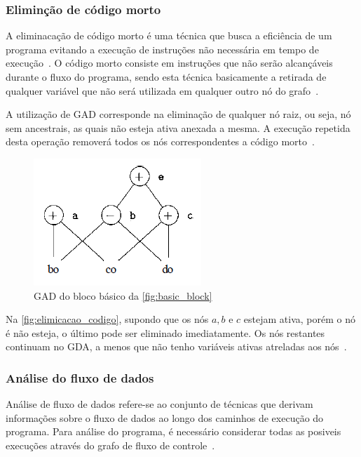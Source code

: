 

\subsubsection{Eliminção de código morto}

A eliminacação de código morto é uma técnica que busca a eficiência de um programa evitando a execução de instruções não necessária em tempo de execução~\cite{knoop1994partial}. O código morto consiste em instruções que não serão alcançáveis durante o fluxo do programa, sendo esta técnica basicamente a  retirada de qualquer variável que não será utilizada em qualquer outro nó do grafo~\cite{aho2007compilers}.

\par
A utilização de GAD corresponde na eliminação de qualquer nó raiz, ou seja, nó sem ancestrais, as quais não esteja ativa anexada a mesma. A execução repetida desta operação removerá todos os nós correspondentes a código morto~\cite{aho2007compilers}.

\begin{figure}[htb]
	\begin{center}
    \caption{\label{fig:elimicacao_codigo}GAD do bloco básico da \autoref{fig:basic_block}}
	\includegraphics[scale=0.70]{Figuras/eliminacao_codigo.png}
	\end{center}
\end{figure}

Na \autoref{fig:elimicacao_codigo}, supondo que os nós $a,b$ e $c$ estejam ativa, porém o nó é não esteja, o último pode ser eliminado imediatamente. Os nós restantes continuam no GDA, a menos que não tenho variáveis ativas atreladas aos nós~\cite{aho2007compilers}.


\subsubsection{Análise do fluxo de dados}
\par
Análise de fluxo de dados refere-se ao conjunto de técnicas que derivam informações sobre o fluxo de dados ao longo dos caminhos de execução do programa. 
Para análise do programa, é necessário considerar todas as posiveis execuções através do grafo de fluxo de controle~\cite{aho2007compilers}.

